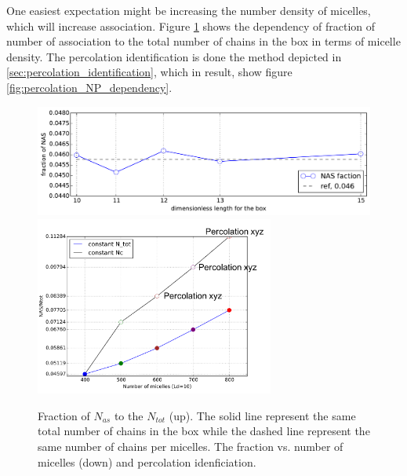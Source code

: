 \documentclass[10pt, a4paper]{article}
\begin{document}
One easiest expectation might be increasing the number density of micelles, which will increase association. Figure \ref{fig:NAS_compare_NP_dependency} shows the dependency of fraction of number of association to the total number of chains in the box in terms of micelle density. The percolation identification is done the method depicted in \ref{sec:percolation_identification}, which in result, show figure \ref{fig:percolation_NP_dependency}.

\begin{figure}
  \centering
  \includegraphics[width=\textwidth]{figures/plt_NAS_timestep.pdf}\\
  \includegraphics[width=0.7\textwidth]{figures/NAS_NP_dependence_percolation.png}
  \caption{Fraction of $N_{as}$ to the $N_{tot}$ (up). The solid line represent the same total number of chains in the box while the dashed line represent the same number of chains per micelles. The fraction vs. number of micelles (down) and percolation idenficiation.}
  \label{fig:NAS_compare_NP_dependency}
\end{figure}
\end{document}
